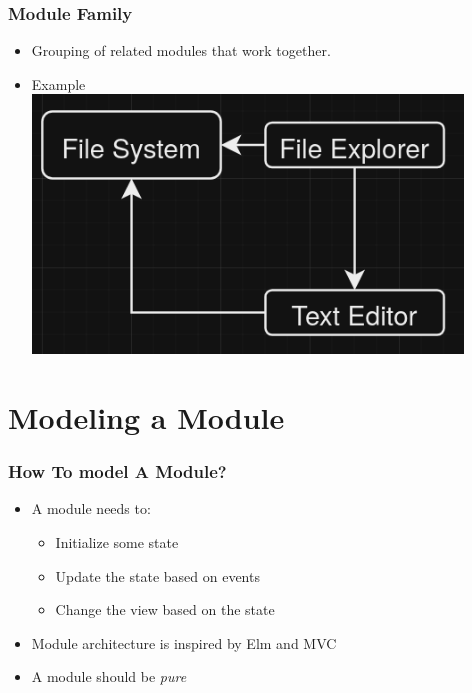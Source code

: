 \hidelogo
\begin{frame}
  \frametitle{Module Family}
  \begin{itemize}
    \item Grouping of related modules that work together.
      \pause
    \item Example
      \includegraphics[width=0.9\textwidth]{./pics/ide-family.png}
  \end{itemize}
\end{frame}

\showlogo
\section{Modeling a Module}
\SectionPage

\begin{frame}
  \frametitle{How To model A Module?}
  \begin{itemize}
    \item A module needs to:
      \pause
      \begin{itemize}
        \item Initialize some state
          \pause
        \item Update the state based on events
          \pause
        \item Change the view based on the state
      \end{itemize}
      \pause
    \item Module architecture is inspired by Elm and MVC
      \pause
    \item A module should be \textit{pure}
  \end{itemize}
\end{frame}

